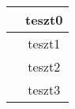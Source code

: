 \documentclass[a4paper]{article}
\begin{document}
\begin{center}

\begin{tabular}{|cc|}
\hline
	&	teszt0							\\
\hline
	&	teszt1							\\
\cline{2-2} %
	&	\multicolumn{1}{|c|}{ teszt2 }	\\
\hline
	&	teszt3							\\
\hline

\end{tabular}

\end{center}
\end{document}
